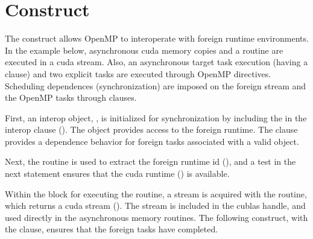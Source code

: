 \section{ Construct}
\label{sec:interop}

The  construct allows OpenMP to interoperate with foreign runtime environments.
In the example below, asynchronous cuda memory copies and a  routine are executed 
in a cuda stream. Also, an asynchronous target task execution (having a  clause) 
and two explicit tasks are executed through OpenMP directives.  Scheduling dependences (synchronization) are
imposed on the foreign stream and the OpenMP tasks through  clauses. 

First, an interop object, , is initialized for synchronization by including the
  in the interop  clause 
().  
The object provides access to the foreign runtime.
The  clause provides a dependence behavior
for foreign tasks associated with a valid object.

Next, the  routine is used to extract the foreign 
runtime id (), and a test in the next statement ensures 
that the cuda runtime () is available.

Within the block for executing the  routine, a stream is acquired 
with the  routine, which returns a cuda stream ().
The stream is included in the cublas handle, and used directly in the asynchronous memory
routines.  The following  construct, with the  clause, 
ensures that the foreign tasks have completed.

